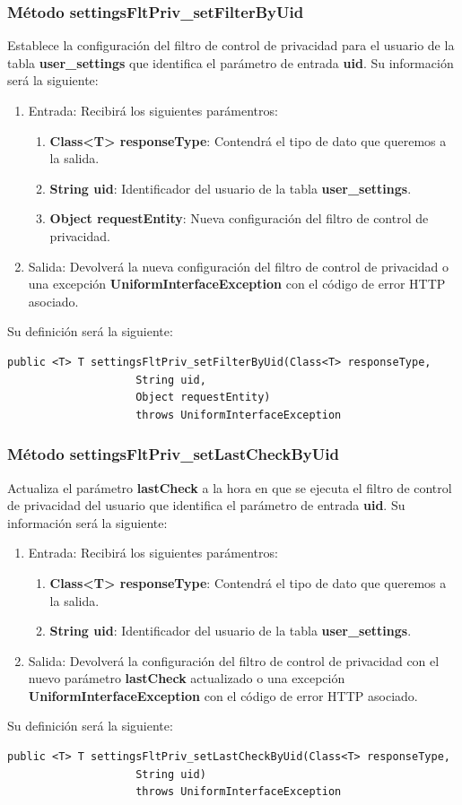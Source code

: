 \subsubsection{Método settingsFltPriv\_setFilterByUid}
Establece la configuración del filtro de control de privacidad para el usuario de la tabla \textbf{user\_settings} que identifica el parámetro de entrada \textbf{uid}. Su información será la siguiente:
\begin{enumerate}
\item Entrada: Recibirá los siguientes parámentros:
\begin{enumerate}
\item \textbf{Class<T> responseType}: Contendrá el tipo de dato que queremos a la salida. 
\item \textbf{String uid}: Identificador del usuario de la tabla \textbf{user\_settings}.
\item \textbf{Object requestEntity}: Nueva configuración del filtro de control de privacidad.
\end{enumerate}
\item Salida: Devolverá la nueva configuración del filtro de control de privacidad o una excepción \textbf{UniformInterfaceException} con el código de error HTTP asociado.
\end{enumerate}
\bigskip
\par
Su definición será la siguiente:
\begin{verbatim}public <T> T settingsFltPriv_setFilterByUid(Class<T> responseType, 
					String uid, 
					Object requestEntity) 
					throws UniformInterfaceException\end{verbatim}

\subsubsection{Método settingsFltPriv\_setLastCheckByUid}
Actualiza el parámetro \textbf{lastCheck} a la hora en que se ejecuta el filtro de control de privacidad del usuario que identifica el parámetro de entrada \textbf{uid}. Su información será la siguiente:
\begin{enumerate}
\item Entrada: Recibirá los siguientes parámentros:
\begin{enumerate}
\item \textbf{Class<T> responseType}: Contendrá el tipo de dato que queremos a la salida. 
\item \textbf{String uid}: Identificador del usuario de la tabla \textbf{user\_settings}.
\end{enumerate}
\item Salida: Devolverá la configuración del filtro de control de privacidad con el nuevo parámetro \textbf{lastCheck} actualizado o una excepción \textbf{UniformInterfaceException} con el código de error HTTP asociado.
\end{enumerate}
\bigskip
\par
Su definición será la siguiente:
\begin{verbatim}public <T> T settingsFltPriv_setLastCheckByUid(Class<T> responseType, 
					String uid) 
					throws UniformInterfaceException\end{verbatim}

